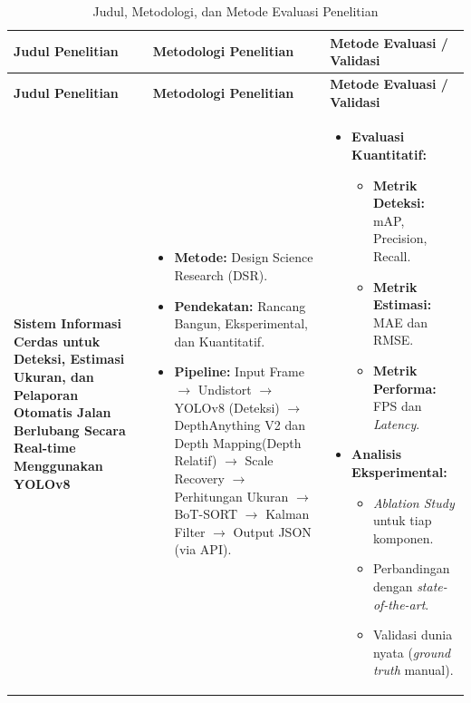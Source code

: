 \documentclass[12pt,a4paper]{article}
\newlength{\colwidth}
\begin{document}
\vspace{1cm}

\begin{longtable}{@{} P{\colwidth} P{\colwidth} P{\colwidth} @{}}
\caption{Judul, Metodologi, dan Metode Evaluasi Penelitian} \\
\toprule
\textbf{Judul Penelitian} &
\textbf{Metodologi Penelitian} &
\textbf{Metode Evaluasi / Validasi} \\
\midrule
\endfirsthead
\toprule
\textbf{Judul Penelitian} &
\textbf{Metodologi Penelitian} &
\textbf{Metode Evaluasi / Validasi} \\
\midrule
\endhead
\bottomrule
\endfoot

\textbf{Sistem Informasi Cerdas untuk Deteksi, Estimasi Ukuran, dan Pelaporan Otomatis Jalan Berlubang Secara Real-time Menggunakan YOLOv8} &

\begin{itemize}
    \item \textbf{Metode:} Design Science Research (DSR).
    \item \textbf{Pendekatan:} Rancang Bangun, Eksperimental, dan Kuantitatif.
    \item \textbf{Pipeline:} Input Frame $\rightarrow$ Undistort $\rightarrow$ YOLOv8 (Deteksi) $\rightarrow$ DepthAnything V2 dan Depth Mapping(Depth Relatif) $\rightarrow$ Scale Recovery $\rightarrow$ Perhitungan Ukuran $\rightarrow$ BoT-SORT $\rightarrow$ Kalman Filter $\rightarrow$ Output JSON (via API).
\end{itemize} &

\begin{itemize}
    \item \textbf{Evaluasi Kuantitatif:}
    \begin{itemize}
        \item \textbf{Metrik Deteksi:} mAP, Precision, Recall.
        \item \textbf{Metrik Estimasi:} MAE dan RMSE.
        \item \textbf{Metrik Performa:} FPS dan \textit{Latency}.
    \end{itemize}
    \item \textbf{Analisis Eksperimental:}
    \begin{itemize}
        \item \textit{Ablation Study} untuk tiap komponen.
        \item Perbandingan dengan \textit{state-of-the-art}.
        \item Validasi dunia nyata (\textit{ground truth} manual).
    \end{itemize}
\end{itemize}

\end{longtable}
\end{document}
